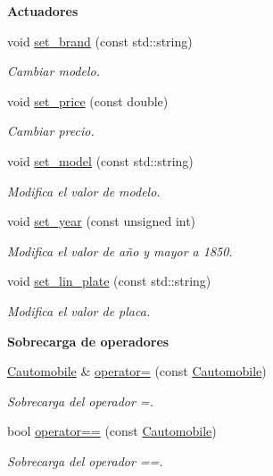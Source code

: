 \begin{Indent}{\bf Actuadores}\par
\begin{DoxyCompactItemize}
\item 
void \hyperlink{class_cautomobile_a73eeb7e9d796dd543aed60259d86dc59}{set\+\_\+brand} (const std\+::string)
\begin{DoxyCompactList}\small\item\em Cambiar modelo. \end{DoxyCompactList}\item 
void \hyperlink{class_cautomobile_a9cfc42dba3baa97c66e802a17fc935cf}{set\+\_\+price} (const double)
\begin{DoxyCompactList}\small\item\em Cambiar precio. \end{DoxyCompactList}\item 
void \hyperlink{class_cautomobile_aff7124d509cd01e8746ec93cdc9d6184}{set\+\_\+model} (const std\+::string)
\begin{DoxyCompactList}\small\item\em Modifica el valor de modelo. \end{DoxyCompactList}\item 
void \hyperlink{class_cautomobile_a2c1a1e039f2f305d839782266aba7ca5}{set\+\_\+year} (const unsigned int)
\begin{DoxyCompactList}\small\item\em Modifica el valor de año y mayor a 1850. \end{DoxyCompactList}\item 
void \hyperlink{class_cautomobile_a2b1216bf9add916b0159aefba3d748f8}{set\+\_\+lin\+\_\+plate} (const std\+::string)
\begin{DoxyCompactList}\small\item\em Modifica el valor de placa. \end{DoxyCompactList}\end{DoxyCompactItemize}
\end{Indent}
\begin{Indent}{\bf Sobrecarga de operadores}\par
\begin{DoxyCompactItemize}
\item 
\hyperlink{class_cautomobile}{Cautomobile} \& \hyperlink{class_cautomobile_af0c8b265ae26b2c051d1ff95097fe1f1}{operator=} (const \hyperlink{class_cautomobile}{Cautomobile})
\begin{DoxyCompactList}\small\item\em Sobrecarga del operador =. \end{DoxyCompactList}\item 
bool \hyperlink{class_cautomobile_a999ac50ad714d2b67601c4c231657af8}{operator==} (const \hyperlink{class_cautomobile}{Cautomobile})
\begin{DoxyCompactList}\small\item\em Sobrecarga del operador ==. \end{DoxyCompactList}\end{DoxyCompactItemize}
\end{Indent}


